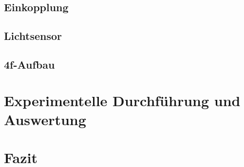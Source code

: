 \documentclass[12pt,a4paper]{article}
\begin{document}
	\subsection{Einkopplung}
	
	\subsection{Lichtsensor}
	
	\subsection{4f-Aufbau}
	
	\label{chap:abb+ft}
		
		
	\section{Experimentelle Durchführung und Auswertung}
	\label{chap:auswertung}		
	
	
	\clearpage
	\newpage
	
	\section{Fazit} %
	
	
	\newpage
	\clearpage
	
	
	
	\newpage
	\clearpage
	
	
	
	
	
	
	\newpage
	
	\listoffigures %
	
	
	
\end{document}
